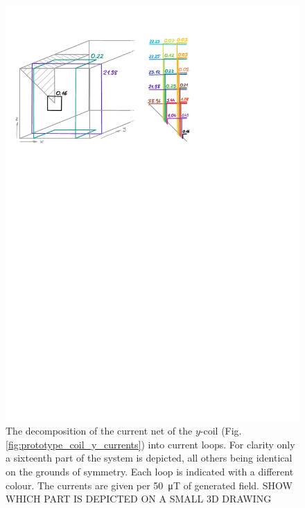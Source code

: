 \begin{figure}
  \centering
  \includegraphics[width=0.9\linewidth]{gfx/prototype/coil_y_decomposition.pdf}
  \caption{The decomposition of the current net of the $y$-coil (Fig.\,\ref{fig:prototype_coil_y_currents}) into current loops. For clarity only a sixteenth part of the system is depicted, all others being identical on the grounds of symmetry. Each loop is indicated with a different colour. The currents are given per \SI{50}{\micro\tesla} of generated field. SHOW WHICH PART IS DEPICTED ON A SMALL 3D DRAWING}\label{fig:prototype_coil_y_decomposition}
\end{figure}

